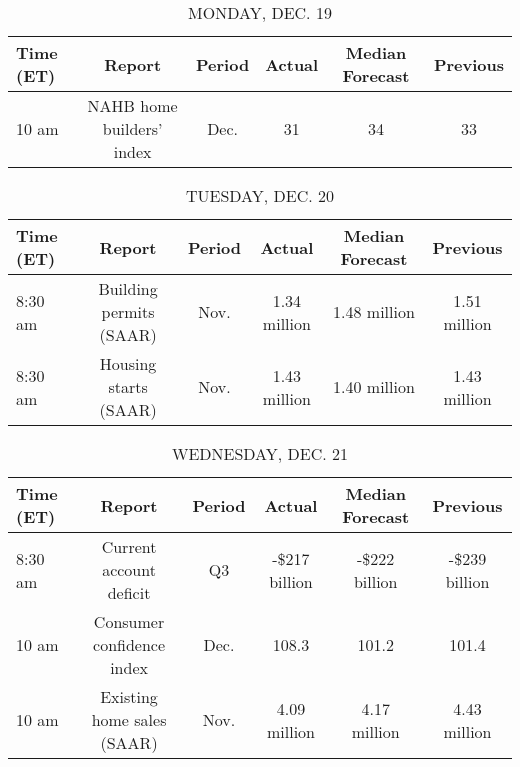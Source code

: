 \documentclass{article}%
\begin{document}
%
\normalsize%


\begin{table}[htbp]%
\caption{MONDAY, DEC. 19}%
\centering%
\begin{adjustbox}{width=1\textwidth}%
\begin{tabular}{lccccc}
\toprule
Time (ET) &                    Report & Period & Actual & Median Forecast & Previous \\
\midrule
    10 am & NAHB home builders' index &   Dec. &     31 &              34 &       33 \\
\bottomrule
\end{tabular}
%
\end{adjustbox}%
\end{table}

%


\begin{table}[htbp]%
\caption{TUESDAY, DEC. 20}%
\centering%
\begin{adjustbox}{width=1\textwidth}%
\begin{tabular}{lccccc}
\toprule
Time (ET) &                  Report & Period &       Actual & Median Forecast &     Previous \\
\midrule
  8:30 am & Building permits (SAAR) &   Nov. & 1.34 million &    1.48 million & 1.51 million \\
  8:30 am &   Housing starts (SAAR) &   Nov. & 1.43 million &    1.40 million & 1.43 million \\
\bottomrule
\end{tabular}
%
\end{adjustbox}%
\end{table}

%


\begin{table}[htbp]%
\caption{WEDNESDAY, DEC. 21}%
\centering%
\begin{adjustbox}{width=1\textwidth}%
\begin{tabular}{lccccc}
\toprule
Time (ET) &                     Report & Period &        Actual & Median Forecast &      Previous \\
\midrule
  8:30 am &    Current account deficit &     Q3 & -\$217 billion &   -\$222 billion & -\$239 billion \\
    10 am &  Consumer confidence index &   Dec. &         108.3 &           101.2 &         101.4 \\
    10 am & Existing home sales (SAAR) &   Nov. &  4.09 million &    4.17 million &  4.43 million \\
\bottomrule
\end{tabular}
%
\end{adjustbox}%
\end{table}
\end{document}

